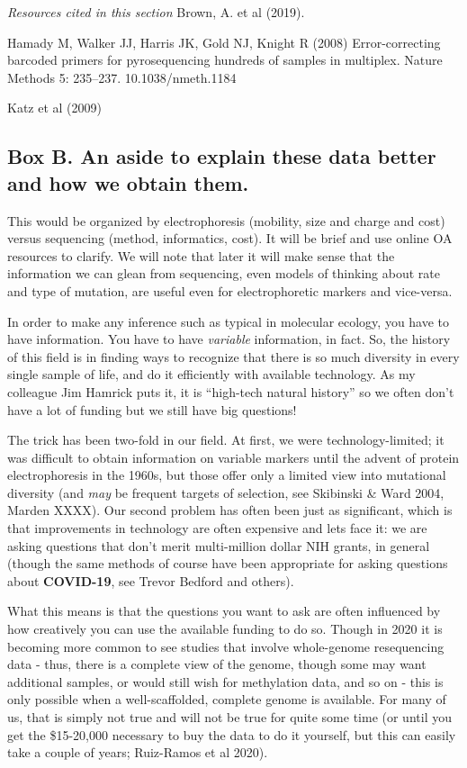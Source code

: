 \documentclass[
]{article}
\begin{document}
\emph{Resources cited in this section} Brown, A. et al (2019).

Hamady M, Walker JJ, Harris JK, Gold NJ, Knight R (2008)
Error-correcting barcoded primers for pyrosequencing hundreds of samples
in multiplex. Nature Methods 5: 235--237. 10.1038/nmeth.1184

Katz et al (2009)

\hypertarget{BoxB}{%
\subsection{Box B. An aside to explain these data better and how we
obtain them.}\label{BoxB}}

This would be organized by electrophoresis (mobility, size and charge
and cost) versus sequencing (method, informatics, cost). It will be
brief and use online OA resources to clarify. We will note that later it
will make sense that the information we can glean from sequencing, even
models of thinking about rate and type of mutation, are useful even for
electrophoretic markers and vice-versa.

In order to make any inference such as typical in molecular ecology, you
have to have information. You have to have \emph{variable} information,
in fact. So, the history of this field is in finding ways to recognize
that there is so much diversity in every single sample of life, and do
it efficiently with available technology. As my colleague Jim Hamrick
puts it, it is ``high-tech natural history'' so we often don't have a
lot of funding but we still have big questions!

The trick has been two-fold in our field. At first, we were
technology-limited; it was difficult to obtain information on variable
markers until the advent of protein electrophoresis in the 1960s, but
those offer only a limited view into mutational diversity (and
\emph{may} be frequent targets of selection, see Skibinski \& Ward 2004,
Marden XXXX). Our second problem has often been just as significant,
which is that improvements in technology are often expensive and lets
face it: we are asking questions that don't merit multi-million dollar
NIH grants, in general (though the same methods of course have been
appropriate for asking questions about \textbf{COVID-19}, see Trevor
Bedford and others).

What this means is that the questions you want to ask are often
influenced by how creatively you can use the available funding to do so.
Though in 2020 it is becoming more common to see studies that involve
whole-genome resequencing data - thus, there is a complete view of the
genome, though some may want additional samples, or would still wish for
methylation data, and so on - this is only possible when a
well-scaffolded, complete genome is available. For many of us, that is
simply not true and will not be true for quite some time (or until you
get the \$15-20,000 necessary to buy the data to do it yourself, but
this can easily take a couple of years; Ruiz-Ramos et al 2020).
\end{document}
